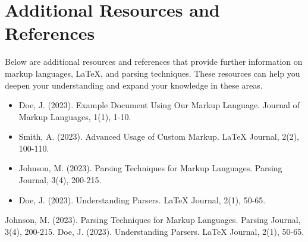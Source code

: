 \documentclass[oneside]{memoir}
\begin{document}
\section{Additional Resources and References}
Below are additional resources and references that provide further information on markup languages, LaTeX, and parsing techniques. These resources can help you deepen your understanding and expand your knowledge in these areas.\par
\begin{itemize}
\item Doe, J. (2023). Example Document Using Our Markup Language. Journal of Markup Languages, 1(1), 1-10.
\item Smith, A. (2023). Advanced Usage of Custom Markup. LaTeX Journal, 2(2), 100-110.
\item Johnson, M. (2023). Parsing Techniques for Markup Languages. Parsing Journal, 3(4), 200-215.
\item Doe, J. (2023). Understanding Parsers. LaTeX Journal, 2(1), 50-65.
\end{itemize}
\begin{thebibliography}{100}
Johnson, M. (2023). Parsing Techniques for Markup Languages. Parsing Journal, 3(4), 200-215.
Doe, J. (2023). Understanding Parsers. LaTeX Journal, 2(1), 50-65.
\end{thebibliography}
\end{document}
